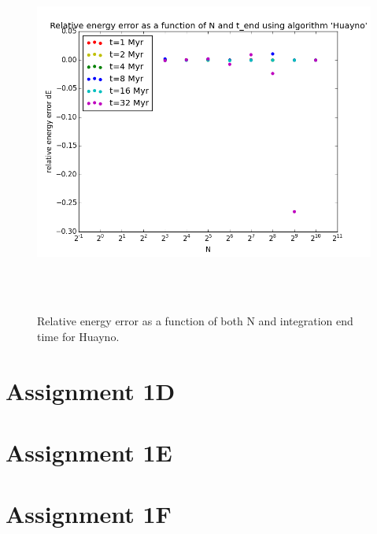 \documentclass[a4paper]{article}
\begin{document}
\begin{figure}[h!]
\begin{center}
\includegraphics[height=12cm]{../GravitationalDynamics/plots/CA_GD_TLRH_s1603221_SS_s1617451_Huayno_dE.png}
\caption{Relative energy error as a function of both N and integration end time for Huayno.}
\label{fig:Huayno_dE}
\end{center}
\end{figure}

\section*{Assignment 1D}

\section*{Assignment 1E}

\section*{Assignment 1F}

\newpage
 
 
\end{document}
